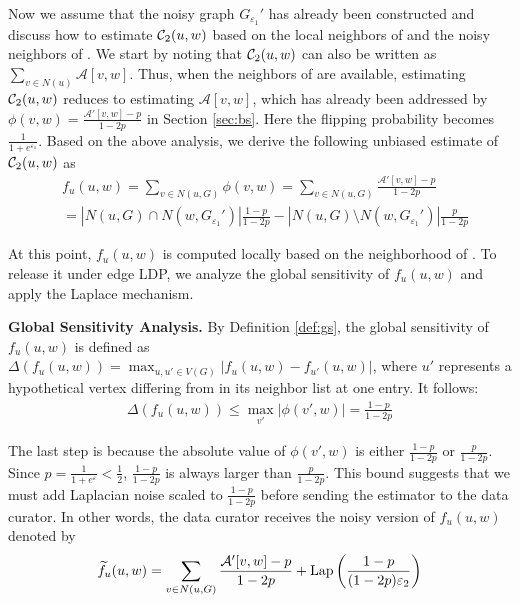 Now we assume that the noisy graph $G_{\varepsilon_1}'$ has already been constructed and discuss how to estimate $\mathcal{C}_2(u,w)$ based on the local neighbors of \vq and the noisy neighbors of \vx. 
We start by noting that $\mathcal{C}_2(u,w)$ can also be written as $\sum_{v \in N(u)} \mathcal{A}[v,w] $. 
Thus, when the neighbors of \vq are available, estimating $\mathcal{C}_2(u,w)$ reduces to estimating $\mathcal{A}[v,w]$, which has already been addressed by $\phi(v, w) = \frac{\mathcal{A}'[v,w]-p}{1-2p}$ in Section \ref{sec:bs}. Here the flipping probability becomes $\frac{1}{1 + e^{\varepsilon_1}}$. 
Based on the above analysis, we derive the following unbiased estimate of $\mathcal{C}_2(u,w)$ as 
\begin{align*}
   & f_u(u, w) = \sum_{ v \in N(u, G) } \phi(v, w)  = 
   \sum_{ v \in N(u, G) } \frac{\mathcal{A}'[v,w]-p}{1-2p} \\ 
   & = |N(u, G) \cap N(w, G_{\varepsilon_1}') | \frac{1-p}{1-2p} -|N(u, G) \setminus N(w,G_{\varepsilon_1}') |\frac{p}{1-2p} 
\end{align*}

At this point, $f_u(u, w)$ is computed locally based on the neighborhood of \vq. To release it under edge LDP, we analyze the global sensitivity of $f_u(u, w)$ and apply the Laplace mechanism. 

\noindent
{\bf Global Sensitivity Analysis.}
By Definition \ref{def:gs}, the global sensitivity of $f_u(u, w)$ is defined as $\Delta(f_u(u, w)) = \max_{u, u' \in V(G)} | f_u(u, w) - f_{u'}(u, w) |$, 
where $u'$ represents a hypothetical vertex differing from \vq in its neighbor list at one entry. 
It follows:
\begin{align*}
\Delta(f_u(u, w)) 
\leq \max_{v'} | \phi(v', w) | = \frac{1-p}{1-2p}
\end{align*}

The last step is because the absolute value of $\phi(v', w)$ is either $\frac{1-p}{1-2p}$ or $\frac{p}{1-2p}$. Since $p = \frac{1}{1+ e ^{\varepsilon}} < \frac{1}{2}$, $\frac{1-p}{1-2p}$ is always larger than $\frac{p}{1-2p}$. 
This bound suggests that we must add Laplacian noise scaled to $\frac{1-p}{1-2p}$ before sending the estimator to the data curator. 
In other words, the data curator receives the noisy version of $f_u(u, w)$ denoted by 
\begin{align}
\widetilde{f}_u(u,w) = \sum_{v \in N(u, G)} \frac{\mathcal{A}'[v,w]-p}{1-2p} + \text{Lap}\left(\frac{1-p}{(1-2p) \varepsilon_2}\right)
\label{eq:fq}
\end{align}

